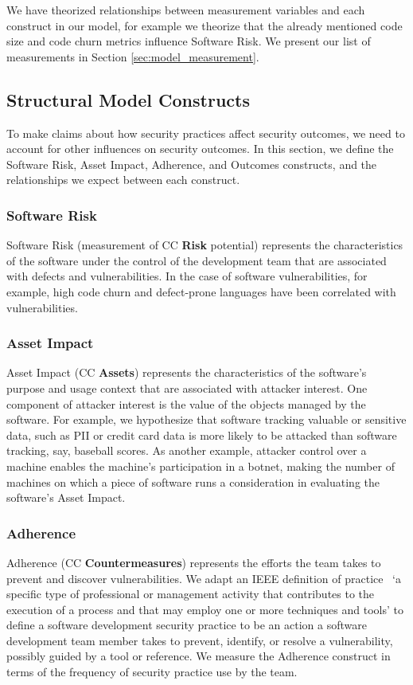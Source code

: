 We have theorized relationships between measurement variables and each construct in our model, for example we theorize that the already mentioned code size and code churn metrics influence Software Risk. We present our list of measurements in Section \ref{sec:model_measurement}.

\subsection{Structural Model Constructs}
 \label{sec:model_structual}
To make claims about how security practices affect security outcomes, we need to account for other influences on security outcomes. In this section, we define the Software Risk, Asset Impact, Adherence, and Outcomes constructs, and the relationships we expect between each construct. 

\subsubsection{Software Risk}
Software Risk (measurement of CC \textbf{Risk} potential) represents the characteristics of the software under the control of the development team that are associated with defects and vulnerabilities. In the case of software vulnerabilities, for example, high code churn and defect-prone languages have been correlated with vulnerabilities.

\subsubsection{Asset Impact}
Asset Impact (CC \textbf{Assets}) represents the characteristics of the software's purpose and usage context that are associated with attacker interest. One component of attacker interest is the value of the objects managed by the software. For example, we hypothesize that software tracking valuable or sensitive data, such as PII or credit card data is more likely to be attacked than software tracking, say, baseball scores. As another example, attacker control over a machine enables the machine's participation in a botnet, making the number of machines on which a piece of software runs a consideration in evaluating the software's Asset Impact.

\subsubsection{Adherence}
\label{sec:model_contruct_adherence}
Adherence (CC \textbf{Countermeasures}) represents the efforts the team takes to prevent and discover vulnerabilities. We adapt an IEEE definition of practice~\cite{ieee1990glossary} `a specific type of professional or management activity that contributes to 
the execution of a process and that may employ one or more techniques and tools' to define a software development security practice to be an action a software development team member takes to prevent, identify, or resolve a vulnerability, possibly guided by a tool or reference. We measure the Adherence construct in terms of the frequency  of security practice use by the team.  

